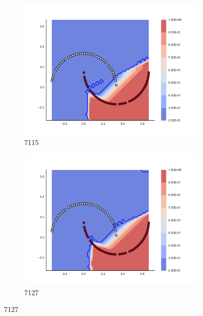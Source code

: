 \begin{figure}[h]
\begin{subfigure}[b]{0.09\textwidth}
    \includegraphics[clip, trim=2.35cm 1.75cm 4.5cm 0cm,width=\textwidth]{img/convergence/7115.pdf}
    \caption{7115}
    \label{fig:convergence_7115}
\end{subfigure}
%
\begin{subfigure}[b]{0.09\textwidth}
    \includegraphics[clip, trim=2.35cm 1.75cm 4.5cm 0cm,width=\textwidth]{img/convergence/7127.pdf}
    \caption{7127}
    \label{fig:convergence_7127}
\end{subfigure}
%
        \end{figure}
